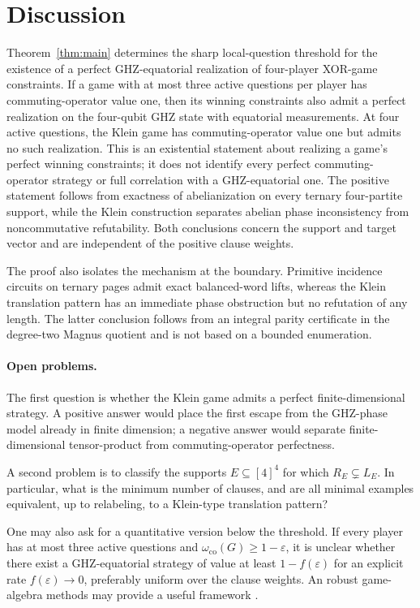 \documentclass[11pt]{article}
\theoremstyle{definition}
\theoremstyle{remark}
\newcommand{\co}{\mathrm{co}}
\numberwithin{equation}{section}
\begin{document}
\section{Discussion}\label{sec:discussion}

Theorem~\ref{thm:main} determines the sharp local-question threshold for the
existence of a perfect GHZ-equatorial realization of four-player XOR-game
constraints.  If a game with at most three active questions per player has
commuting-operator value one, then its winning constraints also admit a
perfect realization on the four-qubit GHZ state with equatorial measurements.
At four active questions, the Klein game has commuting-operator value one but
admits no such realization.  This is an existential statement about realizing
a game's perfect winning constraints; it does not identify every perfect
commuting-operator strategy or full correlation with a GHZ-equatorial one.
The positive statement follows from exactness of abelianization on every
ternary four-partite support, while the Klein construction separates abelian
phase inconsistency from noncommutative refutability.  Both conclusions
concern the support and target vector and are independent of the positive
clause weights.

The proof also isolates the mechanism at the boundary.  Primitive incidence
circuits on ternary pages admit exact balanced-word lifts, whereas the Klein
translation pattern has an immediate phase obstruction but no refutation of
any length.  The latter conclusion follows from an integral parity
certificate in the degree-two Magnus quotient and is not based on a bounded
enumeration.

\paragraph{Open problems.}

The first question is whether the Klein game admits a perfect
finite-dimensional strategy.  A positive answer would place the first escape
from the GHZ-phase model already in finite dimension; a negative answer would
separate finite-dimensional tensor-product from commuting-operator
perfectness.

A second problem is to classify the supports \(E\subseteq[4]^4\) for which
\(R_E\subsetneq L_E\).  In particular, what is the minimum number of clauses,
and are all minimal examples equivalent, up to relabeling, to a Klein-type
translation pattern?

One may also ask for a quantitative version below the threshold.  If every
player has at most three active questions and
\(\omega_{\co}(G)\geq1-\varepsilon\), it is unclear whether there exist a GHZ-equatorial
strategy of value at least \(1-f(\varepsilon)\) for an explicit rate
\(f(\varepsilon)\to0\), preferably uniform over the clause weights. An robust game-algebra
methods may provide a useful framework \cite{Zhao2024}.
\end{document}
